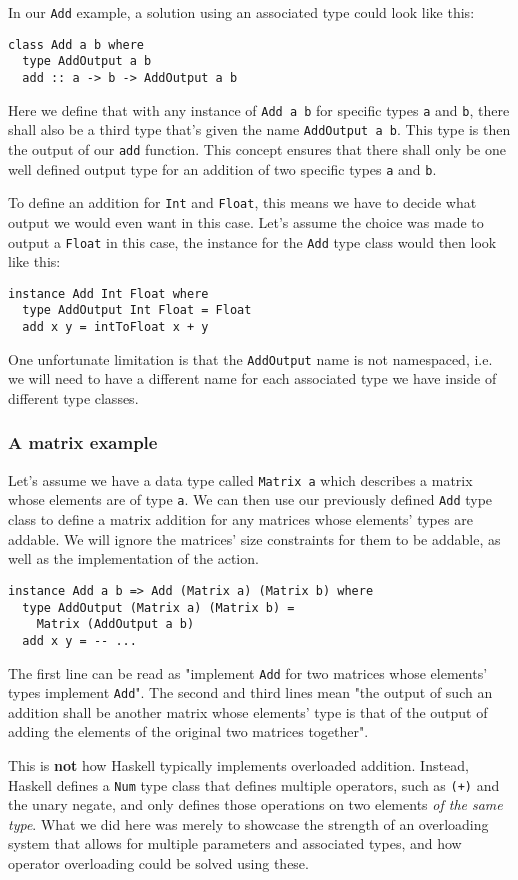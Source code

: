 In our \verb|Add| example, a solution using an associated type could look like this:
\begin{verbatim}
class Add a b where
  type AddOutput a b
  add :: a -> b -> AddOutput a b
\end{verbatim}
Here we define that with any instance of \verb|Add a b| for specific types \verb|a| and \verb|b|, there shall also be a third type that's given the name \verb|AddOutput a b|. This type is then the output of our \verb|add| function. This concept ensures that there shall only be one well defined output type for an addition of two specific types \verb|a| and \verb|b|.

To define an addition for \verb|Int| and \verb|Float|, this means we have to decide what output we would even want in this case. Let's assume the choice was made to output a \verb|Float| in this case, the instance for the \verb|Add| type class would then look like this:
\begin{verbatim}
instance Add Int Float where
  type AddOutput Int Float = Float
  add x y = intToFloat x + y
\end{verbatim}
One unfortunate limitation is that the \verb|AddOutput| name is not namespaced, i.e. we will need to have a different name for each associated type we have inside of different type classes.

\subsubsection{A matrix example}\label{haskell-matrix}

Let's assume we have a data type called \verb|Matrix a| which describes a matrix whose elements are of type \verb|a|. We can then use our previously defined \verb|Add| type class to define a matrix addition for any matrices whose elements' types are addable. We will ignore the matrices' size constraints for them to be addable, as well as the implementation of the action.
\begin{verbatim}
instance Add a b => Add (Matrix a) (Matrix b) where
  type AddOutput (Matrix a) (Matrix b) =
    Matrix (AddOutput a b)
  add x y = -- ...
\end{verbatim}
The first line can be read as "implement \verb|Add| for two matrices whose elements' types implement \verb|Add|". The second and third lines mean "the output of such an addition shall be another matrix whose elements' type is that of the output of adding the elements of the original two matrices together".

This is \textbf{not} how Haskell typically implements overloaded addition. Instead, Haskell defines a \verb|Num| type class that defines multiple operators, such as \verb|(+)| and the unary negate, and only defines those operations on two elements \textit{of the same type}. What we did here was merely to showcase the strength of an overloading system that allows for multiple parameters and associated types, and how operator overloading could be solved using these.

